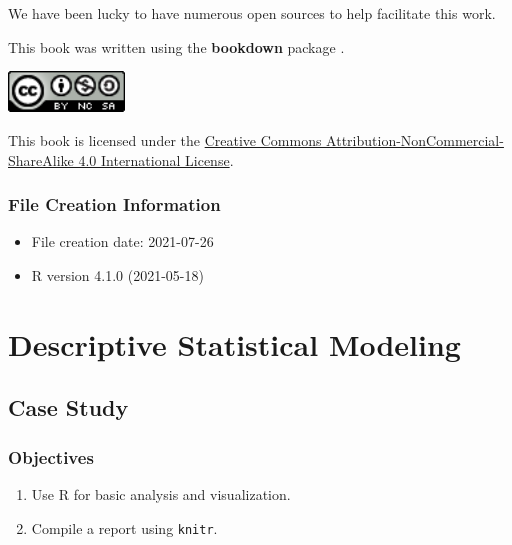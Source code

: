 \documentclass[
]{book}
\providecommand{\tightlist}{%
  \setlength{\itemsep}{0pt}\setlength{\parskip}{0pt}}
\begin{document}
We have been lucky to have numerous open sources to help facilitate this work.

This book was written using the \textbf{bookdown} package \citep{R-bookdown}.

\includegraphics[width=1.22in]{./figures/by-nc-sa}

This book is licensed under the \href{http://creativecommons.org/licenses/by-nc-sa/4.0/}{Creative Commons Attribution-NonCommercial-ShareAlike 4.0 International License}.

\hypertarget{file-creation-information}{%
\section{File Creation Information}\label{file-creation-information}}

\begin{itemize}
\tightlist
\item
  File creation date: 2021-07-26
\item
  R version 4.1.0 (2021-05-18)
\end{itemize}

\hypertarget{part-descriptive-statistical-modeling}{%
\part{Descriptive Statistical Modeling}\label{part-descriptive-statistical-modeling}}

\hypertarget{CS1}{%
\chapter{Case Study}\label{CS1}}

\hypertarget{objectives}{%
\section{Objectives}\label{objectives}}

\begin{enumerate}
\def\labelenumi{\arabic{enumi})}
\tightlist
\item
  Use R for basic analysis and visualization.\\
\item
  Compile a report using \texttt{knitr}.
\end{enumerate}
\end{document}
